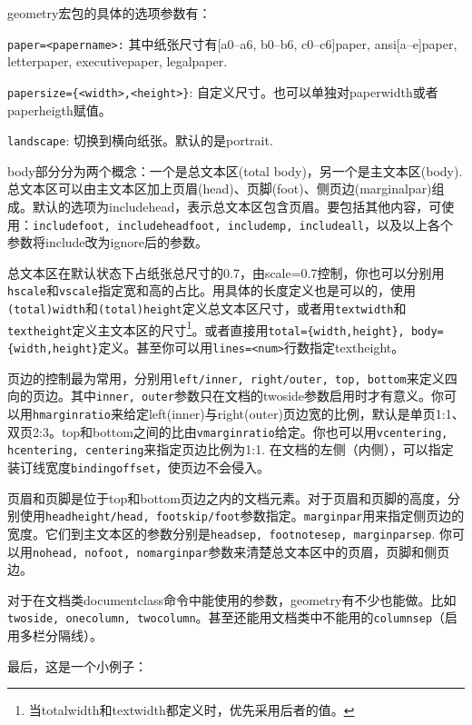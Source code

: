 {geometry宏包的具体的选项参数有：
\begin{feai}
\item \texttt{paper=<papername>:} 其中纸张尺寸有[a0--a6, b0--b6, c0--c6]paper, ansi[a--e]paper, letterpaper, executivepaper, legalpaper.
\item \texttt{papersize=\{<width>,<height>\}}: 自定义尺寸。也可以单独对paperwidth或者paperheigth赋值。
\item \texttt{landscape}: 切换到横向纸张。默认的是portrait.
\end{feai}

body部分分为两个概念：一个是总文本区(total body)，另一个是主文本区(body). 总文本区可以由主文本区加上页眉(head)、页脚(foot)、侧页边(marginalpar)组成。默认的选项为includehead，表示总文本区包含页眉。要包括其他内容，可使用：\texttt{includefoot, includeheadfoot, includemp, includeall}，以及以上各个参数将include改为ignore后的参数。

总文本区在默认状态下占纸张总尺寸的0.7，由scale=0.7控制，你也可以分别用\texttt{hscale}和\texttt{vscale}指定宽和高的占比。用具体的长度定义也是可以的，使用\texttt{(total)width}和\texttt{(total)height}定义总文本区尺寸，或者用\texttt{textwidth}和\texttt{textheight}定义主文本区的尺寸\footnote{当totalwidth和textwidth都定义时，优先采用后者的值。}。或者直接用\texttt{total=\{width,height\}, body=\{width,height\}}定义。甚至你可以用\texttt{lines=<num>}行数指定textheight。

页边的控制最为常用，分别用\texttt{left/inner, right/outer, top, bottom}来定义四向的页边。其中\texttt{inner, outer}参数只在文档的twoside参数启用时才有意义。你可以用\texttt{hmarginratio}来给定left(inner)与right(outer)页边宽的比例，默认是单页1:1、双页2:3。top和bottom之间的比由\texttt{vmarginratio}给定。你也可以用\texttt{vcentering, hcentering, centering}来指定页边比例为1:1. 在文档的左侧（内侧），可以指定装订线宽度\texttt{bindingoffset}，使页边不会侵入。

页眉和页脚是位于top和bottom页边之内的文档元素。对于页眉和页脚的高度，分别使用\texttt{headheight/head, footskip/foot}参数指定。\texttt{marginpar}用来指定侧页边的宽度。它们到主文本区的参数分别是\texttt{headsep, footnotesep, marginparsep}. 你可以用\texttt{nohead, nofoot, nomarginpar}参数来清楚总文本区中的页眉，页脚和侧页边。

对于在文档类documentclass命令中能使用的参数，geometry有不少也能做。比如\texttt{twoside, onecolumn, twocolumn}。甚至还能用文档类中不能用的\texttt{columnsep}（启用多栏分隔线）。

最后，这是一个小例子：
\begin{latex}{}
\usepackage[marginpar=3cm, includemp]{package}
\end{latex}

}
